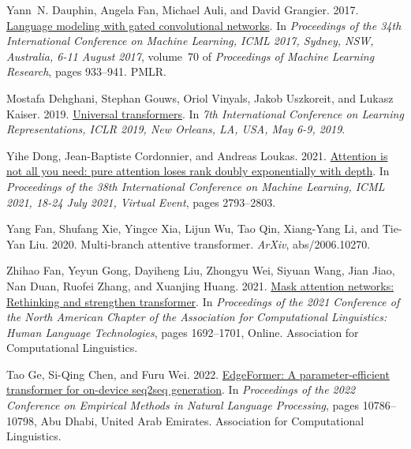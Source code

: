 \documentclass[11pt]{article}
\begin{document}
\begin{thebibliography}{49}
Yann~N. Dauphin, Angela Fan, Michael Auli, and David Grangier. 2017.
\newblock \href {http://proceedings.mlr.press/v70/dauphin17a.html} {Language modeling with gated convolutional networks}.
\newblock In \emph{Proceedings of the 34th International Conference on Machine Learning, {ICML} 2017, Sydney, NSW, Australia, 6-11 August 2017}, volume~70 of \emph{Proceedings of Machine Learning Research}, pages 933--941. {PMLR}.

Mostafa Dehghani, Stephan Gouws, Oriol Vinyals, Jakob Uszkoreit, and Lukasz Kaiser. 2019.
\newblock \href {https://openreview.net/forum?id=HyzdRiR9Y7} {Universal transformers}.
\newblock In \emph{7th International Conference on Learning Representations, {ICLR} 2019, New Orleans, LA, USA, May 6-9, 2019}.

Yihe Dong, Jean{-}Baptiste Cordonnier, and Andreas Loukas. 2021.
\newblock \href {http://proceedings.mlr.press/v139/dong21a.html} {Attention is not all you need: pure attention loses rank doubly exponentially with depth}.
\newblock In \emph{Proceedings of the 38th International Conference on Machine Learning, {ICML} 2021, 18-24 July 2021, Virtual Event}, pages 2793--2803.

Yang Fan, Shufang Xie, Yingce Xia, Lijun Wu, Tao Qin, Xiang-Yang Li, and Tie-Yan Liu. 2020.
\newblock Multi-branch attentive transformer.
\newblock \emph{ArXiv}, abs/2006.10270.

Zhihao Fan, Yeyun Gong, Dayiheng Liu, Zhongyu Wei, Siyuan Wang, Jian Jiao, Nan Duan, Ruofei Zhang, and Xuanjing Huang. 2021.
\newblock \href {https://doi.org/10.18653/v1/2021.naacl-main.135} {Mask attention networks: Rethinking and strengthen transformer}.
\newblock In \emph{Proceedings of the 2021 Conference of the North American Chapter of the Association for Computational Linguistics: Human Language Technologies}, pages 1692--1701, Online. Association for Computational Linguistics.

Tao Ge, Si-Qing Chen, and Furu Wei. 2022.
\newblock \href {https://aclanthology.org/2022.emnlp-main.741} {{E}dge{F}ormer: A parameter-efficient transformer for on-device seq2seq generation}.
\newblock In \emph{Proceedings of the 2022 Conference on Empirical Methods in Natural Language Processing}, pages 10786--10798, Abu Dhabi, United Arab Emirates. Association for Computational Linguistics.


\end{thebibliography}
\end{document}
